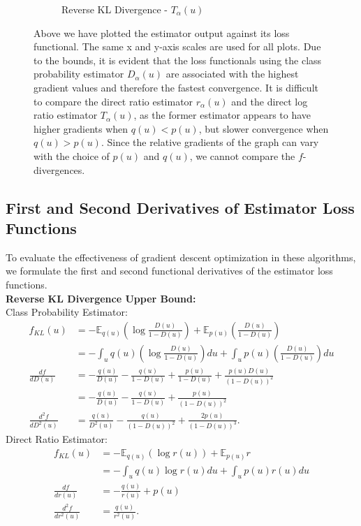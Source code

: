 \documentclass[honours,12pt]{unswthesis}
\newcommand{\E}{\mathbb{E}}
\numberwithin{equation}{section}
\theoremstyle{definition}
\begin{document}
\begin{figure}[h!]
\begin{subfigure}{0.49\textwidth}
\caption{Reverse KL Divergence - $T_\alpha(u)$}
\end{subfigure}
\caption{\small Above we have plotted the estimator output against its loss functional. The same x and y-axis scales are used for all plots. Due to the bounds, it is evident that the loss functionals using the class probability estimator $D_\alpha(u)$ are associated with the highest gradient values and therefore the fastest convergence. It is difficult to compare the direct ratio estimator $r_\alpha(u)$ and the direct log ratio estimator $T_\alpha(u)$, as the former estimator appears to have higher gradients when $q(u)<p(u)$, but slower convergence when $q(u)>p(u)$. Since the relative gradients of the graph can vary with the choice of $p(u)$ and $q(u)$, we cannot compare the $f$-divergences.}
\end{figure}
\subsection{First and Second Derivatives of Estimator Loss Functions}
To evaluate the effectiveness of gradient descent optimization in these algorithms, we formulate the first and second functional derivatives of the estimator loss functions.\\
\textbf{Reverse KL Divergence Upper Bound:}\\
Class Probability Estimator:
\begin{align*}
f_{KL}(u)&=-\E_{q(u)}\left(\log \frac{D(u)}{1-D(u)}\right)+\E_{p(u)}\left(\frac{D(u)}{1-D(u)}\right)\\
&=-\int_u q(u)\left(\log \frac{D(u)}{1-D(u)}\right)du+\int_u p(u)\left(\frac{D(u)}{1-D(u)}\right)du\\
\frac{df}{dD(u)}&=-\frac{q(u)}{D(u)}-\frac{q(u)}{1-D(u)}+\frac{p(u)}{1-D(u)}+\frac{p(u)D(u)}{(1-D(u))^2}\\
&=-\frac{q(u)}{D(u)}-\frac{q(u)}{1-D(u)}+\frac{p(u)}{(1-D(u))^2}\\
\frac{d^2f}{dD^2(u)}&=\frac{q(u)}{D^2(u)}-\frac{q(u)}{(1-D(u))^2}+\frac{2p(u)}{(1-D(u))^3}.
\end{align*}
\newpage
Direct Ratio Estimator:
\begin{align*}
f_{KL}(u)&=-\E_{q(u)}(\log r(u))+\E_{p(u)}r\\
&=-\int_u q(u)\log r(u) du+\int_u p(u)r(u)du\\
\frac{df}{dr(u)}&=-\frac{q(u)}{r(u)}+p(u)\\
\frac{d^2f}{dr^2(u)}&=\frac{q(u)}{r^2(u)}.
\end{align*}
\end{document}
